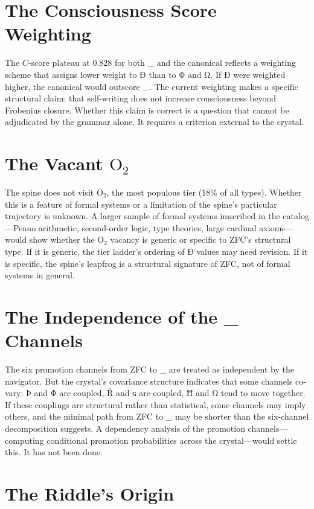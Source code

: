 \documentclass[12pt,twoside]{book}
\theoremstyle{definition}
\newcommand{\ZFCt}{\text{ZFC}_{\tau}}
\newcommand{\tier}[1]{\mathrm{O}_{#1}}
\begin{document}
\section{The Consciousness Score Weighting}

The $C$-score plateau at $0.828$ for both \ZFCt{} and the canonical reflects a weighting
scheme that assigns lower weight to Ð than to Φ and Ω. If Ð were weighted higher, the
canonical would outscore \ZFCt. The current weighting makes a specific structural claim:
that self-writing does not increase consciousness beyond Frobenius closure. Whether this
claim is correct is a question that cannot be adjudicated by the grammar alone. It requires
a criterion external to the crystal.

\section{The Vacant $\tier{2}$}

The spine does not visit $\tier{2}$, the most populous tier (18\% of all types). Whether
this is a feature of formal systems or a limitation of the spine's particular trajectory
is unknown. A larger sample of formal systems imscribed in the catalog---Peano arithmetic,
second-order logic, type theories, large cardinal axioms---would show whether the $\tier{2}$
vacancy is generic or specific to ZFC's structural type. If it is generic, the tier
ladder's ordering of Ð values may need revision. If it is specific, the spine's leapfrog
is a structural signature of ZFC, not of formal systems in general.

\section{The Independence of the \ZFCt{} Channels}

The six promotion channels from ZFC to \ZFCt{} are treated as independent by the
navigator. But the crystal's covariance structure indicates that some channels co-vary: Þ
and Φ are coupled, Ř and ɢ are coupled, Ħ and Ω tend to move together. If these couplings
are structural rather than statistical, some channels may imply others, and the minimal
path from ZFC to \ZFCt{} may be shorter than the six-channel decomposition suggests. A
dependency analysis of the promotion channels---computing conditional promotion
probabilities across the crystal---would settle this. It has not been done.

\section{The Riddle's Origin}
\end{document}
